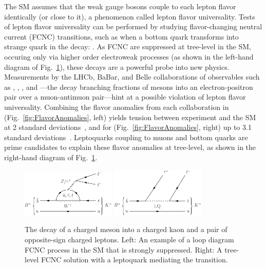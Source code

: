 
The SM assumes that the weak gauge bosons couple to each lepton flavor identically (or close to it), a phenomenon called lepton flavor universality. Tests of lepton flavor universality can be performed by studying flavor-changing neutral current (FCNC) transitions, such as when a bottom quark transforms into strange quark in the decay: \HepProcess{\PB \to \PK\Pleptonplus\Pleptonminus}. As FCNC are suppressed at tree-level in the SM, occuring only via higher order electroweak processes (as shown in the left-hand diagram of Fig.~\ref{fig:FCNC}), these decays are a powerful probe into new physics. Measurements by the LHCb, BaBar, and Belle collaborations of observables such as \Ratio{\PK}, \Ratio{\PKstar}, \Ratio{\PD}, and \Ratio{\PDstar}---the decay branching fractions of \PB mesons into an electron-positron pair over a muon-antimuon pair---hint at a possible violation of lepton flavor universality. Combining the flavor anomalies from each collaboration in \Ratio{\PKstar} (Fig.~\ref{fig:FlavorAnomalies}, left) yields tension between experiment and the SM at 2 standard deviations~\cite{LHCb1}, and for \Ratio{\PK} (Fig.~\ref{fig:FlavorAnomalies}, right) up to 3.1 standard deviations~\cite{LHCb2}. Leptoquarks coupling to muons and bottom quarks are prime candidates to explain these flavor anomalies at tree-level, as shown in the right-hand diagram of Fig.~\ref{fig:FCNC}.

\begin{figure}[H]
    \centering
    \includegraphics[width=0.4\textwidth]{Images/Theory/BplusDecayFCNC.pdf}\hspace{0.1\textwidth}
    \includegraphics[width=0.4\textwidth]{Images/Theory/BplusDecayLQ.pdf}
    \caption{The decay of a charged \PB meson into a charged kaon and a pair of opposite-sign charged leptons. Left: An example of a loop diagram FCNC process in the SM that is strongly suppressed. Right: A tree-level FCNC solution with a leptoquark mediating the transition.}
    \label{fig:FCNC}
\end{figure}

